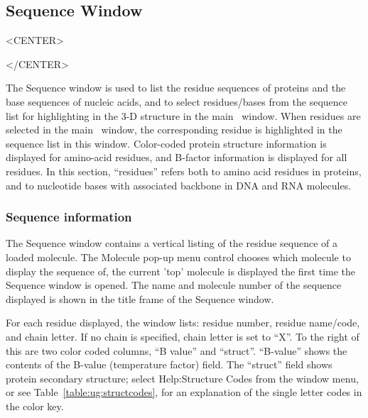 %
%
%


\subsection{Sequence Window}
\label{ug:ui:window:sequence}

\begin{rawhtml}
<CENTER>
\end{rawhtml}
\begin{rawhtml}
</CENTER>
\end{rawhtml}

The Sequence window is used to list the residue sequences of proteins and the 
base sequences of nucleic acids, and to select residues/bases from the sequence
list for highlighting in the 3-D structure in the main \VMD\ window.   When
residues are selected in the main \VMD\ window, the corresponding residue  is
highlighted in the sequence list in this window.  Color-coded protein structure
information is displayed for amino-acid residues, and B-factor information is
displayed for all residues.  In this section, ``residues'' refers both to amino
acid residues in proteins, and to nucleotide bases with associated backbone in
DNA and RNA molecules. 


\subsubsection {Sequence information}

	The  Sequence window contains a vertical listing of the residue sequence of a loaded molecule.  The {\sf Molecule} pop-up menu control chooses which molecule to display the sequence of, the current 'top' molecule is displayed the first time the Sequence window is opened.  The name and molecule number of the  sequence displayed is shown in the title frame of the Sequence window.
       
   For each residue displayed, the window lists: residue number, residue name/code, and chain letter.  If no chain is specified, chain letter is set to ``X''. To the right of this are two color coded columns, ``B value'' and ``struct''.  ``B-value'' shows the contents of the B-value (temperature factor) field. The ``struct'' field shows protein secondary structure; select {\sf Help:Structure Codes} from the window menu, or see Table~\ref{table:ug:structcodes},  for an explanation of the single letter codes in the color key.



